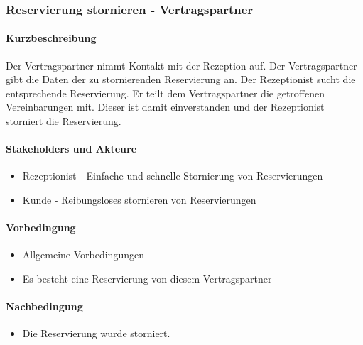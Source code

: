 \subsubsection{Reservierung stornieren - Vertragspartner}

\paragraph{Kurzbeschreibung}
Der \Gls{Vertragspartner} nimmt Kontakt mit der \Gls{Rezeption} auf. Der \Gls{Vertragspartner} gibt die Daten der zu stornierenden Reservierung an. Der \Gls{Rezeptionist} sucht die entsprechende \Gls{Reservierung}. Er teilt dem \Gls{Vertragspartner} die getroffenen Vereinbarungen mit. Dieser ist damit einverstanden und der \Gls{Rezeptionist} storniert die \Gls{Reservierung}.

\paragraph{Stakeholders und Akteure}
\begin{itemize}
\item \Gls{Rezeptionist} - Einfache und schnelle Stornierung von Reservierungen
\item \Gls{Kunde} - Reibungsloses stornieren von Reservierungen
\end{itemize}

\paragraph{Vorbedingung}
\begin{itemize}
\item Allgemeine Vorbedingungen
\item Es besteht eine \Gls{Reservierung} von diesem \Gls{Vertragspartner}
\end{itemize}

\paragraph{Nachbedingung}
\begin{itemize}
\item Die \Gls{Reservierung} wurde storniert.
\end{itemize}

